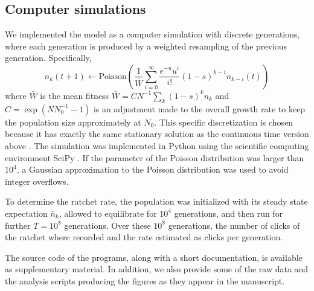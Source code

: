 \documentclass[rmp,preprint]{revtex4}
\newcommand{\n}{n}
\newcommand{\ns}{\bar{\n}}
\newcommand{\mut}{u}
\begin{document}
\subsection*{Computer simulations}
We implemented the model as a computer simulation with discrete generations, where each generation is produced by a weighted resampling of the previous generation. Specifically, 
\begin{equation}
\n_k(t+1) \leftarrow \mathrm{Poisson}\left(\frac{1}{\bar{W}}\sum_{i=0}^\infty \frac{e^{-\mut} \mut^i}{i!}(1-s)^{k-i}\n_{k-i}(t)\right)
\end{equation}
where $\bar{W}$ is the mean fitness $\bar{W}=C N^{-1}\sum_k (1-s)^k \n_k$ and $C = \exp(NN_0^{-1}-1)$ is an adjustment made to the overall growth rate to keep the population size approximately at $N_0$. 
This specific discretization is chosen because it has exactly the same stationary solution as the continuous time version above \citep{Haigh:1978p37141}.  The simulation was implemented in Python using the scientific computing environment SciPy \citep{Oliphant:2007p25672}. If the parameter of the Poisson distribution was larger than $10^4$, a Gaussian approximation to the Poisson distribution was used to avoid integer overflows. 

To determine the ratchet rate, the population was initialized with its steady state expectation $\ns_k$, allowed to equilibrate for $10^4$ generations, and then run for further $T=10^8$ generations. Over these $10^8$ generations, the number of clicks of the ratchet where recorded and the rate estimated as clicks per generation. 

The source code of the programs, along with a short documentation, is available as supplementary material. In addition, we also provide some of the raw data and the analysis scripts producing the figures as they appear in the manuscript.
\end{document}
